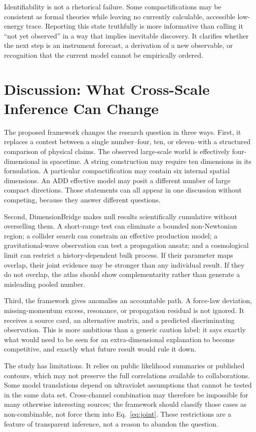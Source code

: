 \documentclass[conference]{IEEEtran}
\begin{document}
Identifiability is not a rhetorical failure. Some compactifications may be consistent as formal theories while leaving no currently calculable, accessible low-energy trace. Reporting this state truthfully is more informative than calling it ``not yet observed'' in a way that implies inevitable discovery. It clarifies whether the next step is an instrument forecast, a derivation of a new observable, or recognition that the current model cannot be empirically ordered.

\section{Discussion: What Cross-Scale Inference Can Change}

The proposed framework changes the research question in three ways. First, it replaces a contest between a single number--four, ten, or eleven--with a structured comparison of physical claims. The observed large-scale world is effectively four-dimensional in spacetime. A string construction may require ten dimensions in its formulation. A particular compactification may contain six internal spatial dimensions. An ADD effective model may posit a different number of large compact directions. Those statements can all appear in one discussion without competing, because they answer different questions.

Second, DimensionBridge makes null results scientifically cumulative without overselling them. A short-range test can eliminate a bounded non-Newtonian region; a collider search can constrain an effective production model; a gravitational-wave observation can test a propagation ansatz; and a cosmological limit can restrict a history-dependent bulk process. If their parameter maps overlap, their joint evidence may be stronger than any individual result. If they do not overlap, the atlas should show complementarity rather than generate a misleading pooled number.

Third, the framework gives anomalies an accountable path. A force-law deviation, missing-momentum excess, resonance, or propagation residual is not ignored. It receives a source card, an alternative matrix, and a predicted discriminating observation. This is more ambitious than a generic caution label: it says exactly what would need to be seen for an extra-dimensional explanation to become competitive, and exactly what future result would rule it down.

The study has limitations. It relies on public likelihood summaries or published contours, which may not preserve the full correlations available to collaborations. Some model translations depend on ultraviolet assumptions that cannot be tested in the same data set. Cross-channel combination may therefore be impossible for many otherwise interesting sources; the framework should classify those cases as non-combinable, not force them into Eq.~\eqref{eq:joint}. These restrictions are a feature of transparent inference, not a reason to abandon the question.
\end{document}
